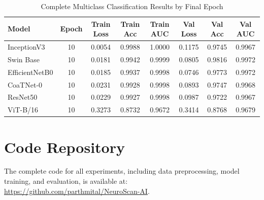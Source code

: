 \documentclass[final,3p,times,number]{elsarticle}
\begin{document}
\begin{table}[H]
\centering
\caption{Complete Multiclass Classification Results by Final Epoch}
\label{tab:complete-multiclass-results}
\scriptsize
\begin{tabular*}{\textwidth}{@{\extracolsep{\fill}}lccccccc@{}}
\toprule
Model & Epoch & Train Loss & Train Acc & Train AUC & Val Loss & Val Acc & Val AUC \\
\midrule
InceptionV3 & 10 & 0.0054 & 0.9988 & 1.0000 & 0.1175 & 0.9745 & 0.9967 \\
Swin Base & 10 & 0.0181 & 0.9942 & 0.9999 & 0.0805 & 0.9816 & 0.9972 \\
EfficientNetB0 & 10 & 0.0185 & 0.9937 & 0.9998 & 0.0746 & 0.9773 & 0.9972 \\
CoaTNet-0 & 10 & 0.0231 & 0.9928 & 0.9998 & 0.0893 & 0.9747 & 0.9968 \\
ResNet50 & 10 & 0.0229 & 0.9927 & 0.9998 & 0.0987 & 0.9722 & 0.9967 \\
ViT-B/16 & 10 & 0.3273 & 0.8732 & 0.9672 & 0.3414 & 0.8768 & 0.9679 \\
\bottomrule
\end{tabular*}
\end{table}
\FloatBarrier

\section{Code Repository}

The complete code for all experiments, including data preprocessing, model training, and evaluation, is available at: \url{https://github.com/parthmital/NeuroScan-AI}.
\end{document}
